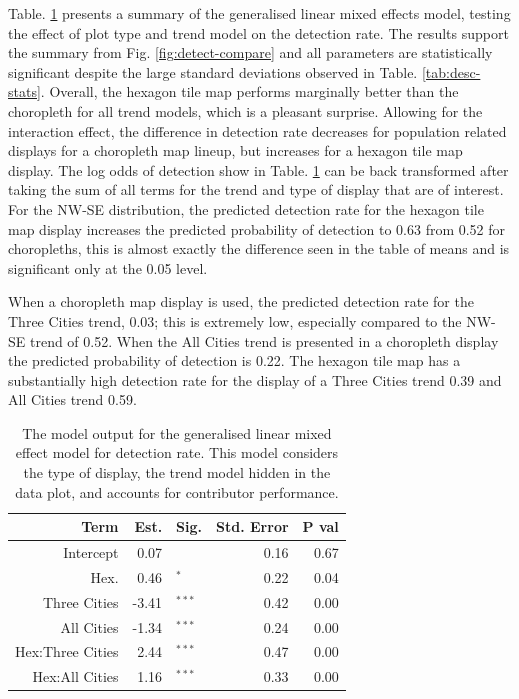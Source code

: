 \documentclass{monashthesis}
\begin{document}
Table. \ref{tab:detect-glmer1} presents a summary of the generalised linear mixed effects model, testing the effect of plot type and trend model on the detection rate. The results support the summary from Fig. \ref{fig:detect-compare} and all parameters are statistically significant despite the large standard deviations observed in Table. \ref{tab:desc-stats}. Overall, the hexagon tile map performs marginally better than the choropleth for all trend models, which is a pleasant surprise. Allowing for the interaction effect, the difference in detection rate decreases for population related displays for a choropleth map lineup, but increases for a hexagon tile map display.
The log odds of detection show in Table. \ref{tab:detect-glmer1} can be back transformed after taking the sum of all terms for the trend and type of display that are of interest.
For the NW-SE distribution, the predicted detection rate for the hexagon tile map display increases the predicted probability of detection to 0.63 from 0.52 for choropleths, this is almost exactly the difference seen in the table of means and is significant only at the 0.05 level.

When a choropleth map display is used, the predicted detection rate for the Three Cities trend, 0.03; this is extremely low, especially compared to the NW-SE trend of 0.52.
When the All Cities trend is presented in a choropleth display the predicted probability of detection is 0.22.
The hexagon tile map has a substantially high detection rate for the display of a Three Cities trend 0.39 and All Cities trend 0.59.

\begin{table}[!h]

\caption{\label{tab:detect-glmer1}The model output for the generalised linear mixed effect model for detection rate. This model considers the type of display, the trend model hidden in the data plot, and accounts for contributor performance.}
\centering
\begin{tabular}[t]{rrlrr}
\toprule
Term & Est. & Sig. & Std. Error & P val\\
\midrule
Intercept & 0.07 & $^{ }$ & 0.16 & 0.67\\
Hex. & 0.46 & $^{*}$ & 0.22 & 0.04\\
\addlinespace
Three Cities & -3.41 & $^{***}$ & 0.42 & 0.00\\
All Cities & -1.34 & $^{***}$ & 0.24 & 0.00\\
\addlinespace
Hex:Three Cities & 2.44 & $^{***}$ & 0.47 & 0.00\\
Hex:All Cities & 1.16 & $^{***}$ & 0.33 & 0.00\\
\bottomrule
\end{tabular}
\end{table}
\end{document}
